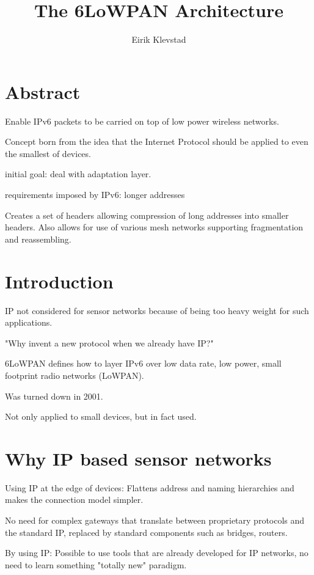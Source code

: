 \documentclass[10pt]{article}
\begin{document}
\author{Eirik Klevstad}
\title{The 6LoWPAN Architecture}
\maketitle


\section{Abstract}

Enable IPv6 packets to be carried on top of low power wireless networks.

Concept born from the idea that the Internet Protocol should be applied to even the smallest of devices.

initial goal: deal with adaptation layer.

requirements imposed by IPv6: longer addresses

Creates a set of headers allowing compression of long addresses into smaller headers. Also allows for use of various mesh networks supporting fragmentation and reassembling.

\section{Introduction}

IP not considered for sensor networks because of being too heavy weight for such applications.

"Why invent a new protocol when we already have IP?"

6LoWPAN defines how to layer IPv6 over low data rate, low power, small footprint radio networks (LoWPAN).

Was turned down in 2001.

Not only applied to small devices, but in fact used. 

\section{Why IP based sensor networks}


Using IP at the edge of devices: Flattens address and naming hierarchies and makes the connection model simpler.

No need for complex gateways that translate between proprietary protocols and the standard IP, replaced by standard components such as bridges, routers.

By using IP: Possible to use tools that are already developed for IP networks, no need to learn something "totally new" paradigm.
\end{document}
